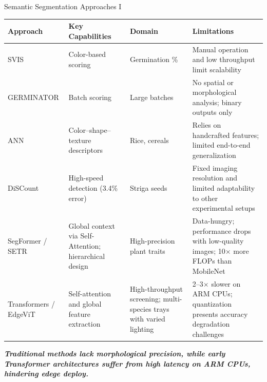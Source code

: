 \documentclass[aspectratio=169]{beamer}
\let\oldcite\cite %
\renewcommand{\cite}[1]{{\tiny\oldcite{#1}}}
\begin{document}
\begin{frame}{Semantic Segmentation Approaches I}
    \begin{table}[H]
    \centering
    \tiny
    \setlength{\tabcolsep}{2pt}
    \begin{tabular}{@{}p{3cm}p{2.6cm}p{2cm}p{3.5cm}@{}}
    \toprule
    \textbf{Approach} & \textbf{Key Capabilities} & \textbf{Domain} & \textbf{Limitations} \\
    \midrule
    SVIS \cite{Hoffmaster2005} &
    Color-based scoring &
    Germination \% &
    Manual operation and low throughput limit scalability \cite{zhang2018high} \\
    \addlinespace[2pt]
    GERMINATOR \cite{joosen2010germinator} &
    Batch scoring &
    Large batches &
    No spatial or morphological analysis; binary outputs only \cite{liu2025phenotyping} \\
    \addlinespace[2pt]
    ANN \cite{Lurstwut2017} &
    Color--shape--texture descriptors &
    Rice, cereals &
    Relies on handcrafted features; limited end-to-end generalization \cite{nanni2017handcrafted} \\
    \addlinespace[2pt]
    DiSCount \cite{Masteling2020} &
    High-speed detection (3.4\% error) &
    Striga seeds &
    Fixed imaging resolution and limited adaptability to other experimental setups \\
    \addlinespace[2pt]
    SegFormer / SETR \cite{xie2021segformer} &
    Global context via Self-Attention; hierarchical design &
    High-precision plant traits &
    Data-hungry; performance drops with low-quality images; 10$\times$ more FLOPs than MobileNet \\
    \addlinespace[2pt]
    Transformers / EdgeViT \cite{pan2022edgevits} &
    Self-attention and global feature extraction  &
    High-throughput screening; multi-species trays with varied lighting &
    2--3$\times$ slower on ARM CPUs; quantization presents accuracy degradation challenges \cite{li2022q} \\
    \bottomrule
    \end{tabular}
    \end{table}
    
    \vspace{0.3cm}
    \small
    \textit{\textbf{Traditional methods lack morphological precision, while early Transformer architectures suffer
    from high latency on ARM CPUs, hindering edege deploy.}}
\end{frame}
\end{document}
